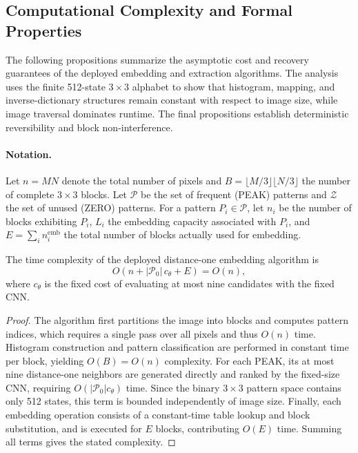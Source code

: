 \subsection{Computational Complexity and Formal Properties}
\label{subsec:complexity-analysis}

\RevisionAddBegin
The following propositions summarize the asymptotic cost and recovery
guarantees of the deployed embedding and extraction algorithms. The analysis
uses the finite 512-state $3\times3$ alphabet to show that histogram, mapping,
and inverse-dictionary structures remain constant with respect to image size,
while image traversal dominates runtime. The final propositions establish
deterministic reversibility and block non-interference.
\RevisionAddEnd

\paragraph{Notation.}
Let $n=MN$ denote the total number of pixels and
$B=\lfloor M/3\rfloor\lfloor N/3\rfloor$ the number of complete
$3\times3$ blocks.
Let $\mathcal{P}$ be the set of frequent (PEAK) patterns and
$\mathcal{Z}$ the set of unused (ZERO) patterns.
For a pattern $P_i \in \mathcal{P}$, let $n_i$ be the number of blocks
exhibiting $P_i$, $L_i$ the embedding capacity associated with $P_i$, and
$E = \sum_i n_i^{\text{emb}}$ the total number of blocks actually used for
embedding.

\begin{proposition}
The time complexity of the deployed distance-one embedding algorithm is
\begin{equation}
O\!\left(n+|\mathcal P_0|\,c_\theta+E\right)=O(n),
\label{eq:embedding-complexity}
\end{equation}
where $c_\theta$ is the fixed cost of evaluating at most nine candidates with
the fixed CNN.
\end{proposition}

\begin{proof}
The algorithm first partitions the image into blocks and computes pattern
indices, which requires a single pass over all pixels and thus $O(n)$ time.
Histogram construction and pattern classification are performed in constant
time per block, yielding $O(B)=O(n)$ complexity.
For each PEAK, its at most nine distance-one neighbors are generated directly
and ranked by the fixed-size CNN, requiring
$O(|\mathcal P_0|c_\theta)$ time. Since the binary $3\times3$ pattern space
contains only 512 states, this term is bounded independently of image size.
Finally, each embedding operation consists of a constant-time table lookup and
block substitution, and is executed for $E$ blocks, contributing $O(E)$ time.
Summing all terms gives the stated complexity.
\end{proof}

